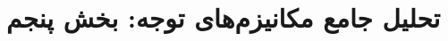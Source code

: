 \documentclass[12pt,a4paper]{report}
\begin{document}
\chapter{تحلیل جامع مکانیزم‌های توجه: بخش پنجم}


\end{document}
